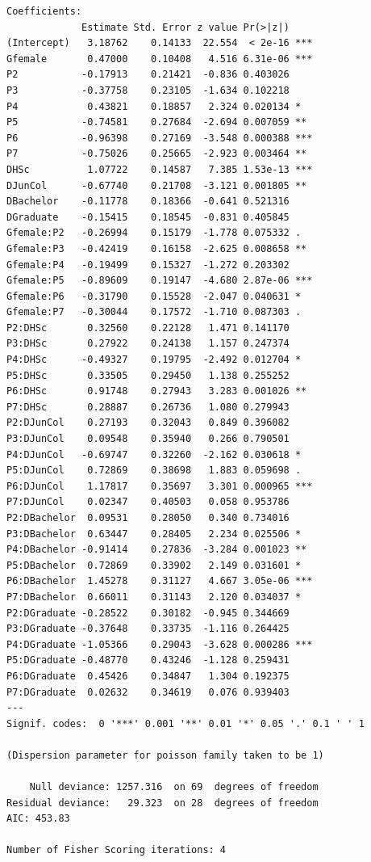 \documentclass[oneside]{book}\usepackage[]{graphicx}\usepackage[svgnames]{xcolor}
\makeatletter
\newenvironment{kframe}{%
 \def\at@end@of@kframe{}%
 \ifinner\ifhmode%
  \def\at@end@of@kframe{\end{minipage}}%
  \begin{minipage}{\columnwidth}%
 \fi\fi%
 \def\FrameCommand##1{\hskip\@totalleftmargin \hskip-\fboxsep
 \colorbox{shadecolor}{##1}\hskip-\fboxsep
     \hskip-\linewidth \hskip-\@totalleftmargin \hskip\columnwidth}%
 \MakeFramed {\advance\hsize-\width
   \@totalleftmargin\z@ \linewidth\hsize
   \@setminipage}}%
 {\par\unskip\endMakeFramed%
 \at@end@of@kframe}
\newenvironment{knitrout}{}{} %
\makeatother
\begin{document}
\begin{knitrout}
\begin{kframe}
\begin{verbatim}
Coefficients:
             Estimate Std. Error z value Pr(>|z|)    
(Intercept)   3.18762    0.14133  22.554  < 2e-16 ***
Gfemale       0.47000    0.10408   4.516 6.31e-06 ***
P2           -0.17913    0.21421  -0.836 0.403026    
P3           -0.37758    0.23105  -1.634 0.102218    
P4            0.43821    0.18857   2.324 0.020134 *  
P5           -0.74581    0.27684  -2.694 0.007059 ** 
P6           -0.96398    0.27169  -3.548 0.000388 ***
P7           -0.75026    0.25665  -2.923 0.003464 ** 
DHSc          1.07722    0.14587   7.385 1.53e-13 ***
DJunCol      -0.67740    0.21708  -3.121 0.001805 ** 
DBachelor    -0.11778    0.18366  -0.641 0.521316    
DGraduate    -0.15415    0.18545  -0.831 0.405845    
Gfemale:P2   -0.26994    0.15179  -1.778 0.075332 .  
Gfemale:P3   -0.42419    0.16158  -2.625 0.008658 ** 
Gfemale:P4   -0.19499    0.15327  -1.272 0.203302    
Gfemale:P5   -0.89609    0.19147  -4.680 2.87e-06 ***
Gfemale:P6   -0.31790    0.15528  -2.047 0.040631 *  
Gfemale:P7   -0.30044    0.17572  -1.710 0.087303 .  
P2:DHSc       0.32560    0.22128   1.471 0.141170    
P3:DHSc       0.27922    0.24138   1.157 0.247374    
P4:DHSc      -0.49327    0.19795  -2.492 0.012704 *  
P5:DHSc       0.33505    0.29450   1.138 0.255252    
P6:DHSc       0.91748    0.27943   3.283 0.001026 ** 
P7:DHSc       0.28887    0.26736   1.080 0.279943    
P2:DJunCol    0.27193    0.32043   0.849 0.396082    
P3:DJunCol    0.09548    0.35940   0.266 0.790501    
P4:DJunCol   -0.69747    0.32260  -2.162 0.030618 *  
P5:DJunCol    0.72869    0.38698   1.883 0.059698 .  
P6:DJunCol    1.17817    0.35697   3.301 0.000965 ***
P7:DJunCol    0.02347    0.40503   0.058 0.953786    
P2:DBachelor  0.09531    0.28050   0.340 0.734016    
P3:DBachelor  0.63447    0.28405   2.234 0.025506 *  
P4:DBachelor -0.91414    0.27836  -3.284 0.001023 ** 
P5:DBachelor  0.72869    0.33902   2.149 0.031601 *  
P6:DBachelor  1.45278    0.31127   4.667 3.05e-06 ***
P7:DBachelor  0.66011    0.31143   2.120 0.034037 *  
P2:DGraduate -0.28522    0.30182  -0.945 0.344669    
P3:DGraduate -0.37648    0.33735  -1.116 0.264425    
P4:DGraduate -1.05366    0.29043  -3.628 0.000286 ***
P5:DGraduate -0.48770    0.43246  -1.128 0.259431    
P6:DGraduate  0.45426    0.34847   1.304 0.192375    
P7:DGraduate  0.02632    0.34619   0.076 0.939403    
---
Signif. codes:  0 '***' 0.001 '**' 0.01 '*' 0.05 '.' 0.1 ' ' 1

(Dispersion parameter for poisson family taken to be 1)

    Null deviance: 1257.316  on 69  degrees of freedom
Residual deviance:   29.323  on 28  degrees of freedom
AIC: 453.83

Number of Fisher Scoring iterations: 4
\end{verbatim}
\end{kframe}
\end{knitrout}
\end{document}
